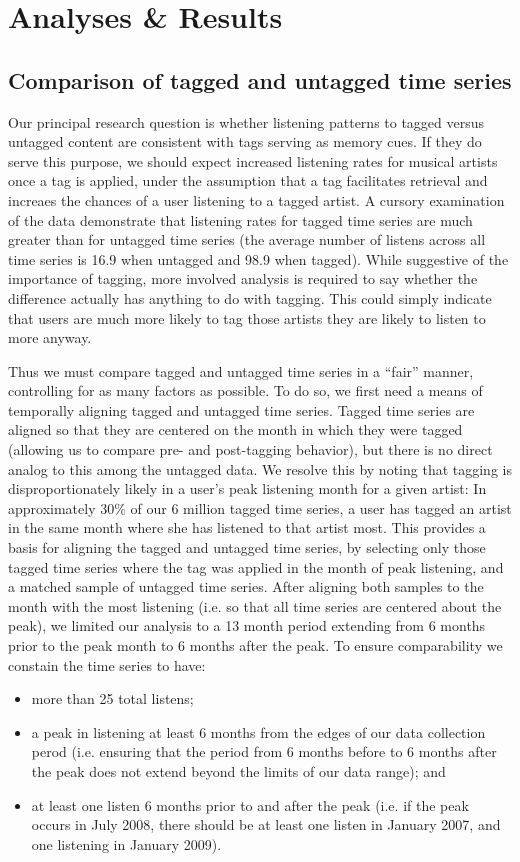 \section{Analyses \& Results}
\label{sec_analyses}

\subsection{Comparison of tagged and untagged time series}
Our principal research question is whether listening patterns to tagged versus untagged content are consistent with tags serving as memory cues. If they do serve this purpose, we should expect increased listening rates for musical artists once a tag is applied, under the assumption that a tag facilitates retrieval and increaes the chances of a user listening to a tagged artist. A cursory examination of the data demonstrate that listening rates for tagged time series are much greater than for untagged time series (the average number of listens across all time series is 16.9  when untagged and 98.9 when tagged). While suggestive of the importance of tagging, more involved analysis is required to say whether the difference actually has anything to do with tagging. This could simply indicate that users are much more likely to tag those artists they are likely to listen to more anyway.

Thus we must compare tagged and untagged time series in a ``fair'' manner, controlling for as many factors as possible. To do so, we first need a means of temporally aligning tagged and untagged time series. Tagged time series are aligned so that they are centered on the month in which they were tagged (allowing us to compare pre- and post-tagging behavior), but there is no direct analog to this among the untagged data. We resolve this by noting that tagging is disproportionately likely in a user's peak listening month for a given artist: In approximately 30\% of our 6 million tagged time series, a user has tagged an artist in the same month where she has listened to that artist most. This provides a basis for aligning the tagged and untagged time series, by selecting only those tagged time series where the tag was applied in the month of peak listening, and a matched sample of untagged time series. After aligning both samples to the month with the most listening (i.e. so that all time series are centered about the peak), we limited our analysis to a 13 month period extending from 6 months prior to the peak month to 6 months after the peak. To ensure comparability we constain the time series to have:
\begin{itemize}
\item more than 25 total listens; 
\item a peak in listening at least 6 months from the edges of our data collection perod (i.e. ensuring that the period from 6 months before to 6 months after the peak does not extend beyond the limits of our data range); and
\item at least one listen 6 months prior to and after the peak (i.e. if the peak occurs in July 2008, there should be at least one listen in January 2007, and one listening in January 2009).
\end{itemize}

